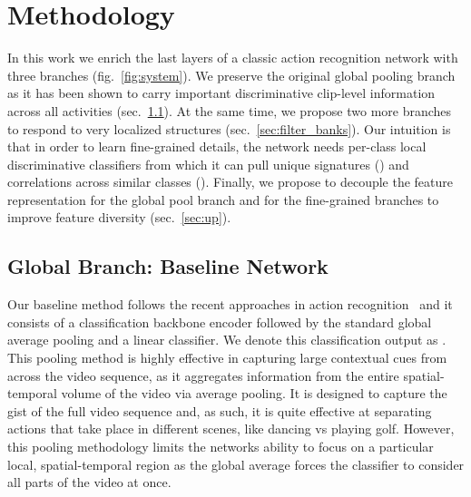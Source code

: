 \documentclass[10pt,twocolumn,letterpaper]{article}
\begin{document}
\section{Methodology}
In this work we enrich the last layers of a classic action recognition network with three branches (fig.~\ref{fig:system}). We preserve the original global pooling branch as it has been shown to carry important discriminative clip-level information across all activities (sec.~\ref{sec:back-bone}). At the same time, we propose two more branches to respond to very localized structures (sec.~\ref{sec:filter_banks}). Our intuition is that in order to learn fine-grained details, the network needs per-class local discriminative classifiers from which it can pull unique signatures () and correlations across similar classes (). Finally, we propose to decouple the feature representation for the global pool branch and for the fine-grained branches to improve feature diversity (sec.~\ref{sec:up}).




\subsection{Global Branch: Baseline Network}
\label{sec:back-bone}

Our baseline method follows the recent approaches in action recognition~\cite{Inflated3D_CVPR17, TSN_TPAMI18} and it consists of a classification backbone encoder followed by the standard global average pooling and a linear classifier.  We denote this classification output as . This pooling method is highly effective in capturing large contextual cues from across the video sequence, as it aggregates information from the entire spatial-temporal volume of the video via average pooling. It is designed to capture the gist of the full video sequence and, as such, it is quite effective at separating actions that take place in different scenes, like dancing vs playing golf. However, this pooling methodology limits the networks ability to focus on a particular local, spatial-temporal region as the global average forces the classifier to consider all parts of the video at once. 
\end{document}
